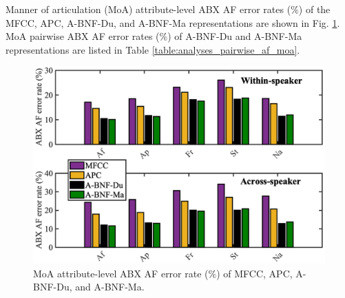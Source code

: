 \documentclass[transmag]{IEEEtran}
\begin{document}
Manner of articulation (MoA) attribute-level ABX AF error rates ($\%$) of the MFCC, APC, A-BNF-Du, and A-BNF-Ma representations are shown in Fig. \ref{fig:analyses_per_af_moa}. MoA pairwise ABX AF error rates ($\%$) of A-BNF-Du and A-BNF-Ma representations are listed in Table \ref{table:analyses_pairwise_af_moa}. 
\begin{figure}[!t]
    \centering
    \includegraphics[width= \linewidth]{MoA_discriminability_abx_adjust_journal.png}
    \caption{MoA attribute-level ABX AF error rate ($\%$) of MFCC, APC, A-BNF-Du, and A-BNF-Ma.}
    \label{fig:analyses_per_af_moa}
\end{figure}
\end{document}
